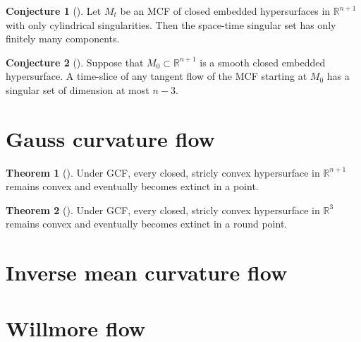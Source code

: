 \documentclass{amsart}
\theoremstyle{definition}
\newtheorem{Thm}{Theorem}[section]
\newtheorem{Con}{Conjecture}[section]
\begin{document}
\begin{refsection}
\begin{Con}[\cite{ColdingMinicozzi2016}]
  Let ${M}_{t}$ be an MCF of closed embedded hypersurfaces in ${\mathbb{R}}^{n+1}$ with only cylindrical singularities. Then 
  the space-time singular set has only finitely many components.
\end{Con}

\begin{Con}[\cite{Ilmanen1995}]
 Suppose that  ${M}_{0}  \subset {\mathbb{R}}^{n+1}$ is a smooth closed embedded hypersurface. A time-slice of any tangent flow of the MCF starting at 
  ${M}_{0}$ has a singular set of dimension at most $n-3$.
\end{Con}

\printbibliography[heading=subbibliography]
\end{refsection}

\newpage

\section{Gauss curvature flow}

\begin{refsection}

\begin{Thm}[\cite{Tso1985}]
Under GCF, every closed, stricly convex hypersurface in $\mathbb{R}^{n+1}$ remains convex and eventually becomes extinct in a point.
\end{Thm}

\begin{Thm}[\cite{Andrews2000}]
Under GCF, every closed, stricly convex hypersurface in $\mathbb{R}^{3}$ remains convex and eventually becomes extinct in a round point.
\end{Thm}

\printbibliography[heading=subbibliography]
\end{refsection}

\section{Inverse mean curvature flow}

\begin{refsection}

\printbibliography[heading=subbibliography]
\end{refsection}

\section{Willmore flow}
\end{document}
